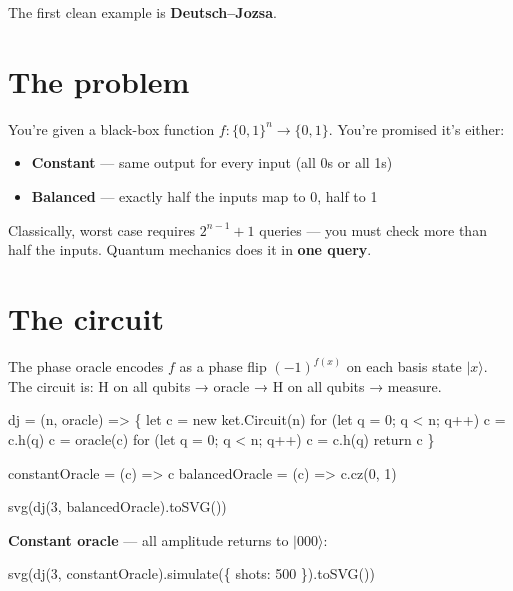 \documentclass[
  11pt,
  letterpaper,
  oneside]{scrbook}
\newenvironment{Shaded}{\begin{snugshade}}{\end{snugshade}}
\newcommand{\NormalTok}[1]{\textcolor[rgb]{0.00,0.23,0.31}{#1}}
\providecommand{\tightlist}{%
  \setlength{\itemsep}{0pt}\setlength{\parskip}{0pt}}
\begin{document}
The first clean example is \textbf{Deutsch--Jozsa}.

\section{The problem}\label{the-problem}

You're given a black-box function \(f : \{0,1\}^n \to \{0,1\}\). You're
promised it's either:

\begin{itemize}
\tightlist
\item
  \textbf{Constant} --- same output for every input (all 0s or all 1s)
\item
  \textbf{Balanced} --- exactly half the inputs map to 0, half to 1
\end{itemize}

Classically, worst case requires \(2^{n-1}+1\) queries --- you must
check more than half the inputs. Quantum mechanics does it in
\textbf{one query}.

\section{The circuit}\label{the-circuit}

The phase oracle encodes \(f\) as a phase flip \((-1)^{f(x)}\) on each
basis state \(|x\rangle\). The circuit is: H on all qubits → oracle → H
on all qubits → measure.

\begin{Shaded}
\begin{Highlighting}[]
\NormalTok{dj = (n, oracle) =\textgreater{} \{}
\NormalTok{  let c = new ket.Circuit(n)}
\NormalTok{  for (let q = 0; q \textless{} n; q++) c = c.h(q)}
\NormalTok{  c = oracle(c)}
\NormalTok{  for (let q = 0; q \textless{} n; q++) c = c.h(q)}
\NormalTok{  return c}
\NormalTok{\}}

\NormalTok{constantOracle = (c) =\textgreater{} c}
\NormalTok{balancedOracle = (c) =\textgreater{} c.cz(0, 1)}

\NormalTok{svg(dj(3, balancedOracle).toSVG())}
\end{Highlighting}
\end{Shaded}

\textbf{Constant oracle} --- all amplitude returns to \(|000\rangle\):

\begin{Shaded}
\begin{Highlighting}[]
\NormalTok{svg(dj(3, constantOracle).simulate(\{ shots: 500 \}).toSVG())}
\end{Highlighting}
\end{Shaded}
\end{document}
